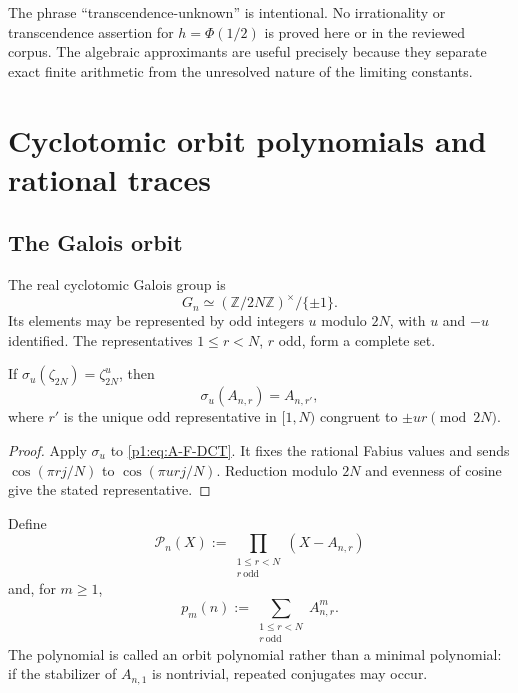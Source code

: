 \documentclass[11pt,oneside]{article}
\theoremstyle{definition}
\theoremstyle{remark}
\newcommand{\Z}{\mathbb Z}
\newcommand{\PhiU}{\Phi}
\begin{document}
\begin{remark}
The phrase ``transcendence-unknown'' is intentional.  No irrationality or
transcendence assertion for $h=\PhiU(1/2)$ is proved here or in the reviewed
corpus.  The algebraic approximants are useful precisely because they separate
exact finite arithmetic from the unresolved nature of the limiting constants.
\end{remark}

\section{Cyclotomic orbit polynomials and rational traces}\label{p1:sec:cyclotomic}

\subsection{The Galois orbit}

The real cyclotomic Galois group is
\begin{equation}\label{p1:eq:G-n}
 G_n\simeq(\Z/2N\Z)^{\times}/\{\pm1\}.
\end{equation}
Its elements may be represented by odd integers $u$ modulo $2N$, with $u$ and
$-u$ identified.  The representatives $1\le r<N$, $r$ odd, form a complete
set.

\begin{proposition}\label{p1:prop:Galois-action}
If $\sigma_u(\zeta_{2N})=\zeta_{2N}^u$, then
\begin{equation}\label{p1:eq:Galois-action}
 \sigma_u(A_{n,r})=A_{n,r'},
\end{equation}
where $r'$ is the unique odd representative in $[1,N)$ congruent to
$\pm ur\pmod{2N}$.
\end{proposition}

\begin{proof}
Apply $\sigma_u$ to \eqref{p1:eq:A-F-DCT}.  It fixes the rational Fabius values and
sends
$\cos(\pi rj/N)$ to $\cos(\pi urj/N)$.  Reduction modulo $2N$ and evenness of
cosine give the stated representative.
\end{proof}

\begin{definition}\label{p1:def:orbit-poly}
Define
\begin{equation}\label{p1:eq:orbit-poly}
 \mathcal P_n(X):=
 \prod_{\substack{1\le r<N\\r\ \mathrm{odd}}}(X-A_{n,r})
\end{equation}
and, for $m\ge1$,
\begin{equation}\label{p1:eq:p-m-n}
 p_m(n):=\sum_{\substack{1\le r<N\\r\ \mathrm{odd}}}A_{n,r}^m.
\end{equation}
The polynomial is called an orbit polynomial rather than a minimal polynomial:
if the stabilizer of $A_{n,1}$ is nontrivial, repeated conjugates may occur.
\end{definition}
\end{document}
